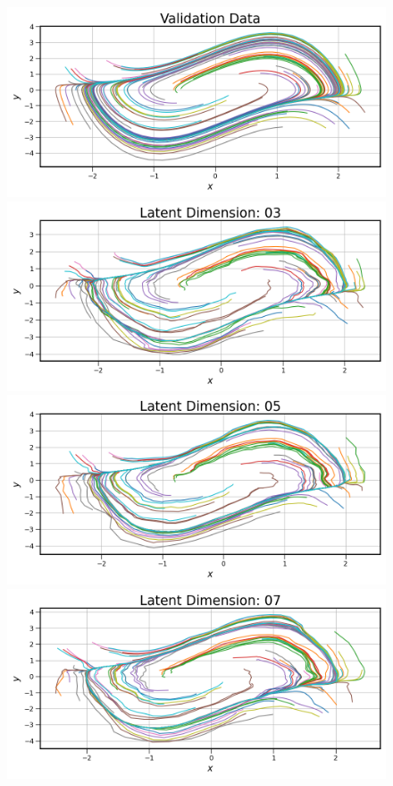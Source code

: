 \begin{figure}[!htbp]
    \centering
    \begin{minipage}{.5\textwidth}
        \includegraphics[width=\textwidth]{"../Figures/van_der_pol_trajectories_00.png"} 
        \includegraphics[width=\textwidth]{"../Figures/van_der_pol_trajectories_03.png"} 
        \includegraphics[width=\textwidth]{"../Figures/van_der_pol_trajectories_05.png"} 
        \includegraphics[width=\textwidth]{"../Figures/van_der_pol_trajectories_07.png"} 

\end{minipage}
\end{figure}
